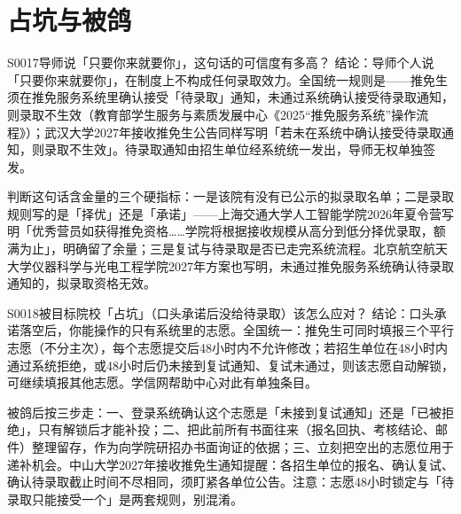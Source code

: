 \section{占坑与被鸽}
\begin{qa}{S0017}{导师说「只要你来就要你」，这句话的可信度有多高？}
结论：导师个人说「只要你来就要你」，在制度上不构成任何录取效力。全国统一规则是——推免生须在推免服务系统里确认接受「待录取」通知，未通过系统确认接受待录取通知，则录取不生效（教育部学生服务与素质发展中心《2025“推免服务系统”操作流程》）；武汉大学2027年接收推免生公告同样写明「若未在系统中确认接受待录取通知，则录取不生效」。待录取通知由招生单位经系统统一发出，导师无权单独签发。

判断这句话含金量的三个硬指标：一是该院有没有已公示的拟录取名单；二是录取规则写的是「择优」还是「承诺」——上海交通大学人工智能学院2026年夏令营写明「优秀营员如获得推免资格……学院将根据接收规模从高分到低分择优录取，额满为止」，明确留了余量；三是复试与待录取是否已走完系统流程。北京航空航天大学仪器科学与光电工程学院2027年方案也写明，未通过推免服务系统确认待录取通知的，拟录取资格无效。
\end{qa}

\begin{qa}{S0018}{被目标院校「占坑」（口头承诺后没给待录取）该怎么应对？}
结论：口头承诺落空后，你能操作的只有系统里的志愿。全国统一：推免生可同时填报三个平行志愿（不分主次），每个志愿提交后48小时内不允许修改；若招生单位在48小时内通过系统拒绝，或48小时后仍未接到复试通知、复试未通过，则该志愿自动解锁，可继续填报其他志愿。学信网帮助中心对此有单独条目。

被鸽后按三步走：一、登录系统确认这个志愿是「未接到复试通知」还是「已被拒绝」，只有解锁后才能补投；二、把此前所有书面往来（报名回执、考核结论、邮件）整理留存，作为向学院研招办书面询证的依据；三、立刻把空出的志愿位用于递补机会。中山大学2027年接收推免生通知提醒：各招生单位的报名、确认复试、确认待录取截止时间不尽相同，须盯紧各单位公告。注意：志愿48小时锁定与「待录取只能接受一个」是两套规则，别混淆。
\end{qa}

